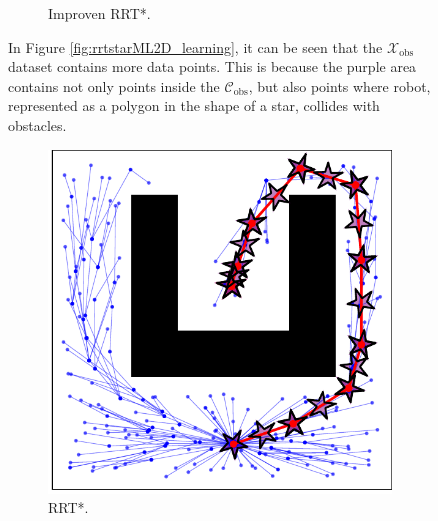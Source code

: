 \documentclass{ctuthesis}
\begin{document}
\begin{figure}[!ht]
\begin{subfigure}[b]{0.45\textwidth}
      \caption{Improven RRT*.}
  \end{subfigure}
  \caption{In Figure \ref{fig:rrtstarML2D_learning}, it can be seen 
  that the $\mathcal{X}_{\text{obs}}$ dataset contains more data points. 
  This is because the purple area contains not only points inside 
  the $\mathcal{C}_{\text{obs}}$,
  but also points where robot, 
  represented as a polygon in the shape of a star, 
  collides with obstacles.}
  \label{fig:LearningConfigSpace2D}
\end{figure}
\begin{figure}[!ht]
  \centering 
  \begin{subfigure}[b]{0.45\textwidth}
      \includegraphics[width=\textwidth]{figChap4/RRTstar2D_maze241.4.pdf}
      \caption{RRT*.}
      \label{fig:rrtstar2D_maze}
  \end{subfigure}  
  \begin{subfigure}[b]{0.45\textwidth}

\end{subfigure}
\end{figure}
\end{document}
